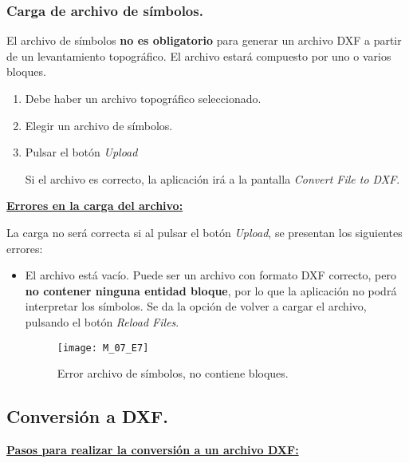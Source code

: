 \subsubsection{Carga de archivo de símbolos.}

El archivo de símbolos \textbf{no es obligatorio} para generar un archivo DXF a partir de un levantamiento topográfico. El archivo estará compuesto por uno o varios bloques.

\begin{enumerate}

\item Debe haber un archivo topográfico seleccionado.
\item Elegir un archivo de símbolos.
\item Pulsar el botón \emph{Upload}

Si el archivo es correcto, la aplicación irá a la pantalla \emph{Convert File to DXF}.

\end{enumerate}

\textbf{\underline{Errores en la carga del archivo:} } 

La carga no será correcta si al pulsar el botón \emph{Upload}, se presentan los siguientes errores:

\begin{itemize}


\item El archivo está vacío. Puede ser un archivo con formato DXF correcto, pero \textbf{no contener ninguna entidad bloque}, por lo que la aplicación no podrá interpretar los símbolos. Se da la opción de volver a cargar el archivo, pulsando el botón \emph{Reload Files}.

\begin{figure}[H]
	\centering
	\texttt{[image: M\_07\_E7]}
	\caption{Error archivo de símbolos, no contiene bloques.}
	\label{fig:M_07_E7}
\end{figure}

\end{itemize}

\subsection{Conversión a DXF.}


\textbf{\underline{Pasos para realizar la conversión a un archivo DXF:} }

